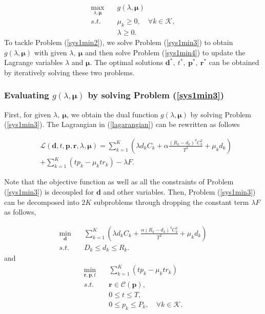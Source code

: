 \documentclass[journal]{IEEEtran}
\begin{document}
\begin{subequations}\label{sys1min4}
	\begin{align}
	\mathop{\max}_{\lambda,\pmb \mu}& \quad g(\lambda,\pmb \mu)\\
	s.t.
	&\quad  \mu_k \geq 0, \quad \forall k\in\mathcal K,\\
	&\quad  \lambda \geq 0.
	\end{align}
\end{subequations}
To tackle Problem (\ref{sys1min2}), we solve Problem (\ref{sys1min3}) to obtain $g(\lambda,\pmb \mu)$ with given $\lambda,~\pmb \mu$ and then solve Problem (\ref{sys1min4}) to update the Lagrange variables $\lambda$ and $\pmb \mu$. The optimal solutions $\pmb d^*,~t^*,~\pmb p^*,~\pmb r^*$ can be obtained by iteratively solving these two problems.

\subsubsection{Evaluating $g(\lambda,\pmb\mu)$ by solving Problem (\ref{sys1min3})}
First, for given $\lambda,~\pmb\mu$, we obtain the dual function $g(\lambda,\pmb\mu)$ by solving Problem (\ref{sys1min3}). The Lagrangian in (\ref{lagarangian}) can be rewritten as follows

\begin{align}\label{lagarangian2}
&\mathcal L(\pmb d,t,\pmb p,\pmb r, \lambda,\pmb \mu)=
\sum_{k=1}^K (\lambda d_kC_k+\alpha\frac{\left(R_{k}-d_{k}\right)^3 C^3_{k}}{T^2}+\mu_kd_k)\\\nonumber
&+\sum_{k=1}^K (tp_k-\mu_ktr_k)-\lambda F.
\end{align}

Note that the objective function as well as all the constraints of Problem (\ref{sys1min3}) is decoupled for $\pmb d$ and other variables. Then, Problem (\ref{sys1min3}) can be decomposed into $2K$ subproblems through dropping the constant term $\lambda F$ as follows,

\begin{subequations}\label{p1}
	\begin{align}
	\mathop{\min}_{\pmb d} \quad &\sum_{k=1}^K (\lambda d_kC_k+\frac{\alpha \left(R_{k}-d_{k}\right)^3C^3_k}{T^2}+\mu_kd_k)\\
	s.t. \quad  & D_k \leq d_k \leq R_k.
	\end{align}
\end{subequations}
and
\begin{subequations}\label{p2}
	\begin{align}
	\mathop{\min}_{\pmb r,\pmb p, t}\quad  &\sum_{k=1}^K (tp_k-\mu_ktr_k)\\
	s.t. \quad &\pmb r \in \mathcal C(\pmb p),\\
	& 0 \leq t \leq T,\\
	&  0\leq p_k\leq P_k, \quad \forall k\in\mathcal K.
	\end{align}
\end{subequations}
\end{document}
